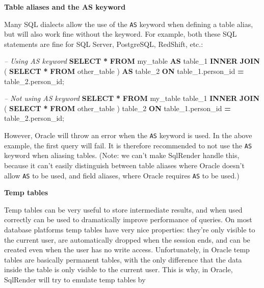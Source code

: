 \documentclass[11pt]{book}
\newenvironment{Shaded}{\begin{snugshade}}{\end{snugshade}}
\newcommand{\CommentTok}[1]{\textcolor[rgb]{0.56,0.35,0.01}{\textit{#1}}}
\newcommand{\KeywordTok}[1]{\textcolor[rgb]{0.13,0.29,0.53}{\textbf{#1}}}
\newcommand{\NormalTok}[1]{#1}
\newcommand{\OperatorTok}[1]{\textcolor[rgb]{0.81,0.36,0.00}{\textbf{#1}}}
\theoremstyle{definition}
\theoremstyle{definition}
\theoremstyle{definition}
\theoremstyle{remark}
\begin{document}
\textbf{Table aliases and the AS keyword}

Many SQL dialects allow the use of the \texttt{AS} keyword when defining a table alias, but will also work fine without the keyword. For example, both these SQL statements are fine for SQL Server, PostgreSQL, RedShift, etc.:

\begin{Shaded}
\begin{Highlighting}[]
\CommentTok{-- Using AS keyword}
\KeywordTok{SELECT} \OperatorTok{*} 
\KeywordTok{FROM}\NormalTok{ my_table }\KeywordTok{AS}\NormalTok{ table_1}
\KeywordTok{INNER} \KeywordTok{JOIN}\NormalTok{ (}
  \KeywordTok{SELECT} \OperatorTok{*} \KeywordTok{FROM}\NormalTok{ other_table}
\NormalTok{) }\KeywordTok{AS}\NormalTok{ table_2}
\KeywordTok{ON}\NormalTok{ table_1.person_id }\OperatorTok{=}\NormalTok{ table_2.person_id;}

\CommentTok{-- Not using AS keyword}
\KeywordTok{SELECT} \OperatorTok{*} 
\KeywordTok{FROM}\NormalTok{ my_table table_1}
\KeywordTok{INNER} \KeywordTok{JOIN}\NormalTok{ (}
  \KeywordTok{SELECT} \OperatorTok{*} \KeywordTok{FROM}\NormalTok{ other_table}
\NormalTok{) table_2}
\KeywordTok{ON}\NormalTok{ table_1.person_id }\OperatorTok{=}\NormalTok{ table_2.person_id;}
\end{Highlighting}
\end{Shaded}

However, Oracle will throw an error when the \texttt{AS} keyword is used. In the above example, the first query will fail. It is therefore recommended to not use the \texttt{AS} keyword when aliasing tables. (Note: we can't make SqlRender handle this, because it can't easily distinguish between table aliases where Oracle doesn't allow \texttt{AS} to be used, and field aliases, where Oracle requires \texttt{AS} to be used.)

\textbf{Temp tables}

Temp tables can be very useful to store intermediate results, and when used correctly can be used to dramatically improve performance of queries. On most database platforms temp tables have very nice properties: they're only visible to the current user, are automatically dropped when the session ends, and can be created even when the user has no write access. Unfortunately, in Oracle temp tables are basically permanent tables, with the only difference that the data inside the table is only visible to the current user. This is why, in Oracle, SqlRender will try to emulate temp tables by
\end{document}
